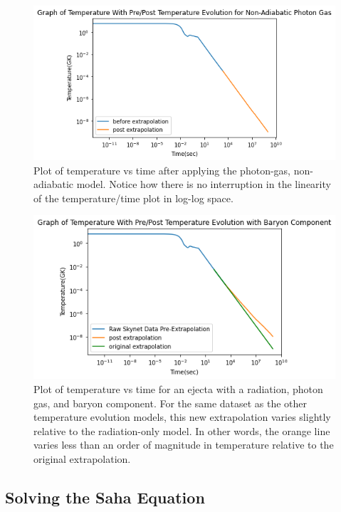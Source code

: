 \documentclass[11pt,a4paper]{article}
\begin{document}
\begin{figure}[h!]
  \includegraphics[scale = .7]{photon_only.png}
  \centering
  \caption{Plot of temperature vs time after applying the photon-gas, non-adiabatic model. Notice how there is no interruption in the linearity of the temperature/time plot in log-log space.}
\end{figure} 

\begin{figure}[H]
  \includegraphics[scale = .7]{photon_baryon.png}
  \centering
  \caption{Plot of temperature vs time for an ejecta with a radiation, photon gas, and baryon component. For the same dataset as the other temperature evolution models, this new extrapolation varies slightly relative to the radiation-only model. In other words, the orange line varies less than an order of magnitude in temperature relative to the original extrapolation. }
\end{figure} 

\subsection{Solving the Saha Equation}
\end{document}
